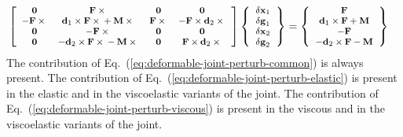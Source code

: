 \documentclass[10pt,dvips,fleqn,subeqn]{report}
\newcommand{\T}[1]{\bm{\mathbf{#1}}}
\begin{document}
\begin{align}
	\footnotesize
	\sqbr{\matr{cccc}{
		\T{0} & \T{F}\times{} & \T{0} & \T{0} \\
		- \T{F}\times{} & \T{d}_1\times\T{F}\times{} + \T{M}\times{} & \T{F}\times{} & - \T{F}\times\T{d}_2\times{} \\
		\T{0} & - \T{F}\times{} & \T{0} & \T{0} \\
		\T{0} & - \T{d}_2\times\T{F}\times{} - \T{M}\times{} & \T{0} & \T{F}\times\T{d}_2\times{}
	}} \cubr{\cvvect{
		\delta\T{x}_1 \\
		\delta\T{g}_1 \\
		\delta\T{x}_2 \\
		\delta\T{g}_2
	}}
%
%
%
	= \cubr{\cvvect{
		\T{F} \\
		\T{d}_1 \times \T{F} + \T{M} \\
		- \T{F} \\
		- \T{d}_2 \times \T{F} - \T{M}
	}} &
	\label{eq:deformable-joint-perturb-common}
\end{align}
The contribution of Eq.~(\ref{eq:deformable-joint-perturb-common})
is always present.
The contribution of Eq.~(\ref{eq:deformable-joint-perturb-elastic})
is present in the elastic and in the viscoelastic variants of the joint.
The contribution of Eq.~(\ref{eq:deformable-joint-perturb-viscous})
is present in the viscous and in the viscoelastic variants of the joint.
\end{document}
